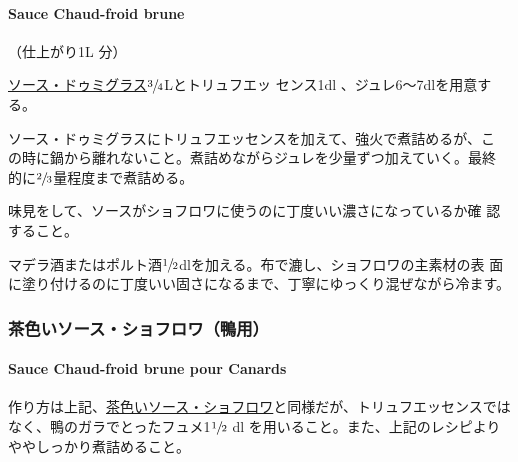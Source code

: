 \documentclass[twoside,12Q,b5j]{escoffierltjsbook}
\newenvironment{recette}{\begin{small}\begin{spacing}{1}\begin{multicols}{2}}{\end{multicols}\end{spacing}\end{small}}
\begin{document}
\begin{recette}
\hypertarget{sauce-chaud-froid-brune}{\paragraph{Sauce Chaud-froid
brune}\label{sauce-chaud-froid-brune}}


（仕上がり1L 分）

\protect\hyperlink{sauce-demi-glace}{ソース・ドゥミグラス}\(\sfrac{3}{4}\)Lとトリュフエッ
センス1dl 、ジュレ6〜7dlを用意する。

ソース・ドゥミグラスにトリュフエッセンスを加えて、強火で煮詰めるが、こ
の時に鍋から離れないこと。煮詰めながらジュレを少量ずつ加えていく。最終
的に\(\sfrac{2}{3}\)量程度まで煮詰める。

味見をして、ソースがショフロワに使うのに丁度いい濃さになっているか確
認すること。

マデラ酒またはポルト酒\(\sfrac{1}{2}\)dlを加える。布で漉し、ショフロワの主素材の表
面に塗り付けるのに丁度いい固さになるまで、丁寧にゆっくり混ぜながら冷ます。

\vspace*{1.7\zw}

\subsubsection{茶色いソース・ショフロワ（鴨用）}\label{ux8336ux8272ux3044ux30bdux30fcux30b9ux30b7ux30e7ux30d5ux30edux30efux9d28ux7528}

\paragraph{Sauce Chaud-froid brune pour
Canards}\label{sauce-chaud-froid-brune-pour-canards}


作り方は上記、\protect\hyperlink{sauce-chaud-froid-brune}{茶色いソース・ショフロワ}と同様だが、トリュフエッセンスではなく、鴨のガラでとったフュメ1\(\sfrac{1}{2}\)
dl を用いること。また、上記のレシピよりややしっかり煮詰めること。


\end{recette}
\end{document}
